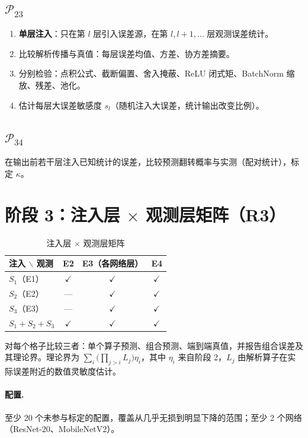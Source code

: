 \documentclass[11pt,a4paper]{ctexart}
\begin{document}
\subsection{$\mathcal P_{23}$}
\begin{enumerate}[leftmargin=*]
  \item \textbf{单层注入}：只在第 $l$ 层引入误差源，在第 $l, l+1, \dots$ 层观测误差统计。
  \item 比较解析传播与真值：每层误差均值、方差、协方差摘要。
  \item 分别检验：点积公式、截断偏置、舍入掩蔽、ReLU 闭式矩、BatchNorm 缩放、残差、池化。
  \item 估计每层大误差敏感度 $s_l$（随机注入大误差，统计输出改变比例）。
\end{enumerate}

\subsection{$\mathcal P_{34}$}
在输出前若干层注入已知统计的误差，比较预测翻转概率与实测（配对统计），标定 $\kappa$。

\section{阶段 3：注入层 $\times$ 观测层矩阵（R3）}
\begin{table}[h]
\centering
\small
\begin{tabular}{@{}lccc@{}}
\toprule
注入 $\backslash$ 观测 & E2 & E3（各网络层） & E4 \\
\midrule
$S_1$（E1） & $\checkmark$ & $\checkmark$ & $\checkmark$ \\
$S_2$（E2） & — & $\checkmark$ & $\checkmark$ \\
$S_3$（E3） & — & $\checkmark$ & $\checkmark$ \\
$S_1+S_2+S_3$ & $\checkmark$ & $\checkmark$ & $\checkmark$ \\
\bottomrule
\end{tabular}
\caption{注入层 $\times$ 观测层矩阵}
\end{table}

对每个格子比较三者：单个算子预测、组合预测、端到端真值，并报告组合误差及其理论界。理论界为 $\sum_i\bigl(\prod_{j>i}L_j\bigr)\eta_i$，其中 $\eta_i$ 来自阶段 2，$L_j$ 由解析算子在实际误差附近的数值灵敏度估计。

\paragraph{配置.} 至少 20 个未参与标定的配置，覆盖从几乎无损到明显下降的范围；至少 2 个网络（ResNet-20、MobileNetV2）。
\end{document}
